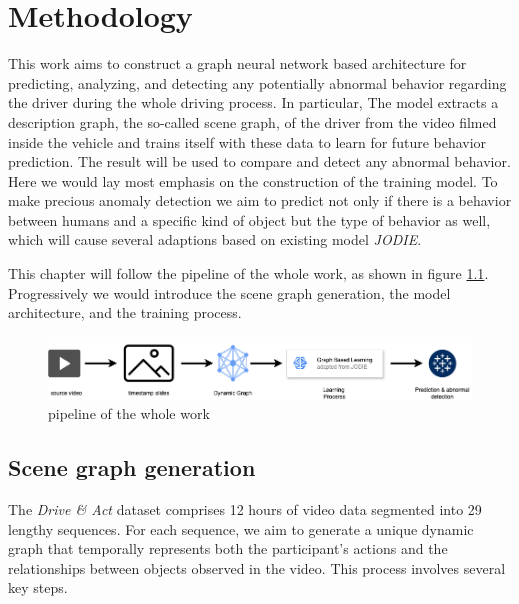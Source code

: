 \chapter{Methodology}\label{chapter:methodology}



This work aims to construct a graph neural network based architecture for predicting, analyzing, and detecting any potentially abnormal behavior regarding the driver during the whole driving process. In particular, The model extracts a description graph, the so-called scene graph, of the driver from the video filmed inside the vehicle and trains itself with these data to learn for future behavior prediction. The result will be used to compare and detect any abnormal behavior. Here we would lay most emphasis on the construction of the training model. To make precious anomaly detection we aim to predict not only if there is a behavior between humans and a specific kind of object but the type of behavior as well, which will cause several adaptions based on existing model \textit{JODIE}. 

This chapter will follow the pipeline of the whole work, as shown in figure \ref{fig:pipeline}. Progressively we would introduce the scene graph generation, the model architecture, and the training process. 

\begin{figure}
    \centering
    \includegraphics[width=\linewidth]{figures/04_pipeline.png}
    \caption{pipeline of the whole work}
    \label{fig:pipeline}
\end{figure}


\section{Scene graph generation}

The \textit{Drive \& Act} dataset comprises 12 hours of video data segmented into 29 lengthy sequences. For each sequence, we aim to generate a unique dynamic graph that temporally represents both the participant's actions and the relationships between objects observed in the video. This process involves several key steps.


